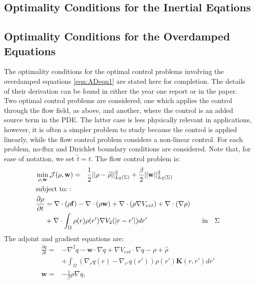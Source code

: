 \documentclass[11pt, a4paper]{article}
\theoremstyle{definition}
\newcommand{\Sta}{\rho}
\newcommand{\Adjb}{q}
\newcommand{\Con}{\mathbf{f}}
\begin{document}
\subsection{Optimality Conditions for the Inertial Eqations}




\subsection{Optimality Conditions for the Overdamped Equations}
The optimality conditions for the optimal control problems involving the overdamped equations \eqref{eqn:ADeqn1} are stated here for completion. The details of their derivation can be found in either the year one report or in the paper.
Two optimal control problems are considered; one which applies the control through the flow field, as above, and another, where the control is an added source term in the PDE. The latter case is less physically relevant in applications, however, it is often a simpler problem to study because the control is applied linearly, while the flow control problem considers a non-linear control. For each problem, no-flux and Dirichlet boundary conditions are considered. Note that, for ease of notation, we set $\tilde t = t$.
The flow control problem is:
\begin{align}
\label{eqn:ADFlowOCP}
&\min_{\Sta,\mathbf{w} } \mathcal J(\Sta,\mathbf{w} ) =\ \ \frac{1}{2}||\Sta - \widehat \Sta||_{L_2(\Sigma)}^2  +\frac{\beta}{2}||\mathbf{w}||_{L_2(\Sigma)}^2\\
& \text{subject to:}: \notag\\
&\frac{\partial \Sta}{\partial t} = \nabla \cdot (\Sta\Con) - \nabla \cdot (\Sta \mathbf{w})  + \nabla \cdot (\rho\nabla V_{ext}) + \nabla \cdot (\nabla \rho)\notag \\
& \quad \ +\nabla \cdot \int_\Omega \Sta(r)\Sta(r') \nabla V_2(|r-r'|)dr' \qquad \qquad \qquad \qquad \text{in} \quad \Sigma\notag
\end{align}
The adjoint and gradient equations are:
\begin{align*}
\frac{\partial \Adjb}{\partial t} =& - \nabla^2\Adjb - \mathbf{w} \cdot \nabla \Adjb + \nabla V_{ext} \cdot \nabla \Adjb - \Sta + \widehat \rho \\
&+\int_\Omega (\nabla_r \Adjb(r) - \nabla_{r'} \Adjb(r') ) \rho(r') \mathbf{K}(r,r') dr'\\
\mathbf{w} =& - \frac{1}{\beta} \Sta \nabla \Adjb,
\end{align*}
\end{document}
